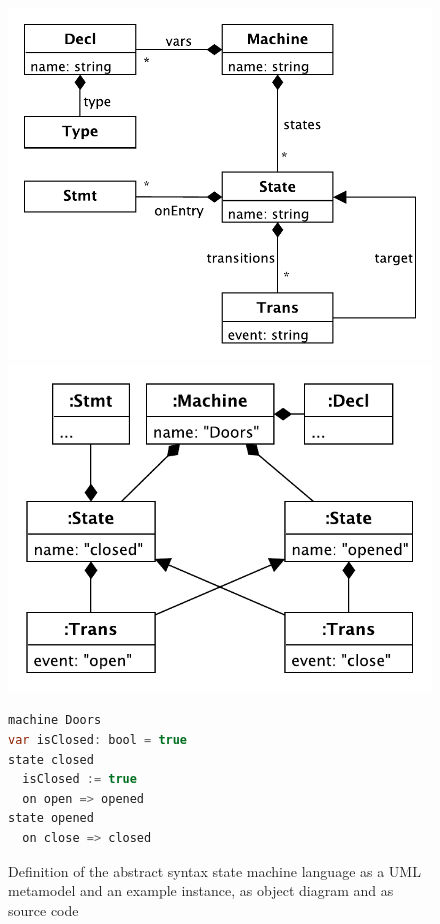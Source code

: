 \documentclass[english,submission]{programming}
\begin{document}
\begin{figure}[t]
\centering
\begin{minipage}{0.3\textwidth}
\includegraphics[width=\textwidth]{figures/metamodel.pdf}
\end{minipage}
\hspace*{2pt}
\vline
\begin{minipage}{0.3\textwidth}
  \includegraphics[width=\textwidth]{figures/doors-ast.pdf}
  \end{minipage}
\hspace*{2pt}
\vline
\begin{minipage}{0.3\textwidth}
  \begin{lstlisting}[language=java,morekeywords={machine,on,state,var},basicstyle=\footnotesize,numbers=none]
machine Doors
var isClosed: bool = true
state closed
  isClosed := true
  on open => opened
state opened
  on close => closed
\end{lstlisting}
\end{minipage}
\caption{Definition of the abstract syntax state machine language as a UML metamodel and an example instance, as object diagram and as source code}
\label{FIG:statemachineUML}
\end{figure}
\end{document}
